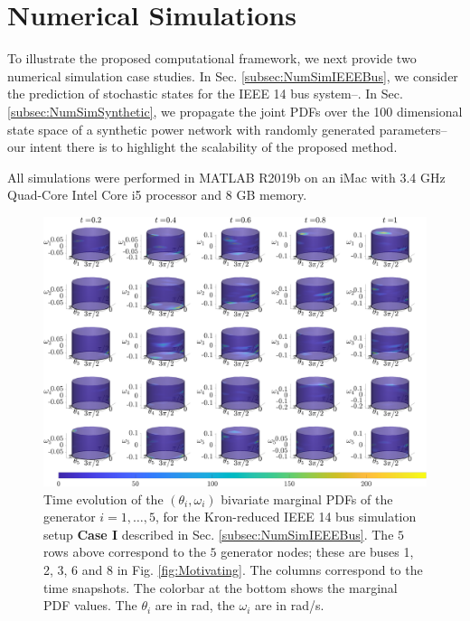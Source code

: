 \documentclass[10pt,twocolumn]{IEEEtran}
\newcommand{\red}{\color{red}}
\begin{document}

\section{Numerical Simulations}\label{sec:NumericalSimulations}
To illustrate the proposed computational framework, we next provide two numerical simulation case studies. In Sec. \ref{subsec:NumSimIEEEBus}, we consider the prediction of stochastic states for the IEEE 14 bus system--{\red{our main objective being to highlight the interpretability and utility of the proposed method in power systems engineering}}. In Sec. \ref{subsec:NumSimSynthetic}, we propagate the joint PDFs over the 100 dimensional state space of a synthetic power network with randomly generated parameters--our intent there is to highlight the scalability of the proposed method. 

All simulations were performed in MATLAB R2019b on an iMac with 3.4 GHz Quad-Core Intel Core i5 processor and 8 GB memory. 



\begin{figure}[t]
\centering
\includegraphics[width=0.9\linewidth]{IEEE14marginalsCase0.png}
\caption{\small{Time evolution of the $(\theta_{i},\omega_{i})$ bivariate marginal PDFs of the generator $i=1,\hdots,5$, for the Kron-reduced IEEE 14 bus simulation setup \textbf{Case I} described in Sec. \ref{subsec:NumSimIEEEBus}. The $5$ rows above correspond to the $5$ generator nodes; these are buses 1, 2, 3, 6 and 8 in Fig. \ref{fig:Motivating}. The columns correspond to the time snapshots. The colorbar at the bottom shows the marginal PDF values. The $\theta_i$ are in rad, the $\omega_i$ are in rad/s.}}
\vspace*{-0.1in}
\label{fig:IEEE14marginalsCase0}
\end{figure}
\end{document}
